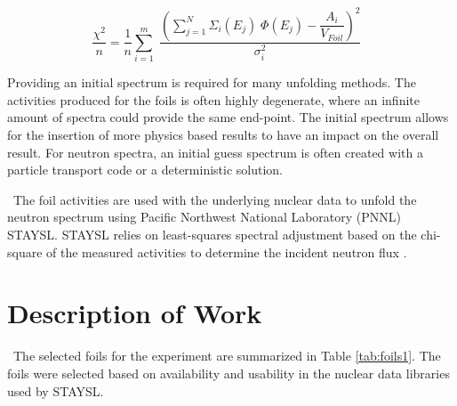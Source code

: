 \documentclass[journal]{IEEEtran}
\begin{document}
	\begin{equation} \label{eq:LeastSq}
	\dfrac{\chi^2}{n}= \dfrac{1}{n}\sum_{i=1}^{m} \; \dfrac{(\sum_{j=1}^{N} \Sigma_{i}(E_{j}) \;\Phi(E_{j})-\dfrac{A_{i}}{V_{Foil}})^{2}}{\sigma_{i}^{2}} \,\;\; 
	\end{equation}
	
	Providing an initial spectrum is required for many unfolding methods. 
The activities produced for the foils is often highly degenerate, where an infinite amount of spectra could provide the same end-point. 
The initial spectrum allows for the insertion of more physics based results to have an impact on the overall result. 
For neutron spectra, an initial guess spectrum is often created with a particle transport code or a deterministic solution. 

	\ The foil activities are used with the underlying nuclear data to unfold the neutron spectrum using Pacific Northwest National Laboratory (PNNL) STAYSL. 
STAYSL relies on least-squares spectral adjustment based on the chi-square of the measured activities to determine the incident neutron flux \cite{Greenwood2016}. 
	
	\section{Description of Work}
	\ The selected foils for the experiment are summarized in Table \ref{tab:foils1}. 
The foils were selected based on availability and usability in the nuclear data libraries used by STAYSL. %
	
\end{document}

